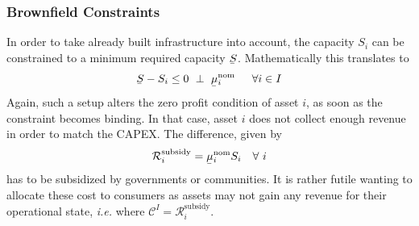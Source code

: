\documentclass[11pt,twocolumn]{article}
\newcommand{\ie}{\textit{i.e.} }
\newcommand{\ubar}[1]{\underaccent{\bar}{#1}}
\newcommand{\hpad}{\hspace{15pt}}
\newcommand{\resultsin}[1]{\hspace{6pt} \bot  \hspace{6pt} #1}
\newcommand{\Forall}[1]{\hspace{10pt} \forall \,\, #1 }
\newcommand{\state}{s_{i,t}}
\newcommand{\capacity}{S_{i}}
\newcommand{\costfactor}{\gamma_{i,t}}
\newcommand{\capacitylower}{\ubar{S}}
\newcommand{\muuppernom}{\bar{\mu}^\text{nom}_{i}}
\newcommand{\mulowernom}{\ubar{\mu}^\text{nom}_{i}}
\newcommand{\muuppergenerationnom}{\bar{\mu}^\text{nom}_{s}}
\newcommand{\cost}{\mathcal{C}}
\newcommand{\remainingcost}{\mathcal{R}}
\newcommand{\subsidycost}{\remainingcost^\text{subsidy}}
\begin{document}


\subsubsection{Brownfield Constraints}

In order to take already built infrastructure into account, the capacity $\capacity$ can be constrained to a minimum required capacity $\capacitylower$. Mathematically this translates to 
\begin{align}
    \capacitylower - \capacity  \le 0 \resultsin{\mulowernom} \hpad \forall{i \in I}
\label{eq:capacityexpansionminimum}
\end{align}
Again, such a setup alters the zero profit condition of asset $i$, as soon as the constraint becomes binding. 
In that case, asset $i$ does not collect enough revenue in order to match the CAPEX. The difference, given by 
\begin{align}
    \subsidycost_i = \mulowernom \capacity
    \Forall{i}
\end{align}
has to be subsidized by governments or communities. It is rather futile wanting to allocate these cost to consumers as assets may not gain any revenue for their operational state, \ie where $\cost^I = \subsidycost_i $. 




\end{document}

